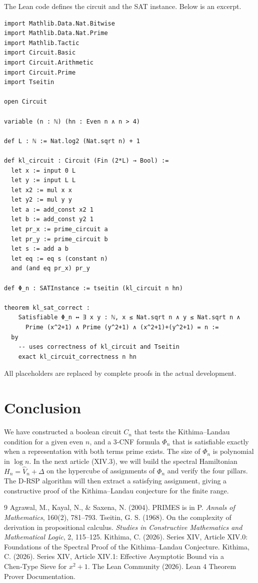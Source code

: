 \documentclass[11pt,a4paper]{article}
\begin{document}
The Lean code defines the circuit and the SAT instance. Below is an excerpt.

\begin{lstlisting}[style=lean, caption={SeriesXIV/KLCircuit.lean (excerpt)}]
import Mathlib.Data.Nat.Bitwise
import Mathlib.Data.Nat.Prime
import Mathlib.Tactic
import Circuit.Basic
import Circuit.Arithmetic
import Circuit.Prime
import Tseitin

open Circuit

variable (n : ℕ) (hn : Even n ∧ n > 4)

def L : ℕ := Nat.log2 (Nat.sqrt n) + 1

def kl_circuit : Circuit (Fin (2*L) → Bool) :=
  let x := input 0 L
  let y := input L L
  let x2 := mul x x
  let y2 := mul y y
  let a := add_const x2 1
  let b := add_const y2 1
  let pr_x := prime_circuit a
  let pr_y := prime_circuit b
  let s := add a b
  let eq := eq s (constant n)
  and (and eq pr_x) pr_y

def Φ_n : SATInstance := tseitin (kl_circuit n hn)

theorem kl_sat_correct :
    Satisfiable Φ_n ↔ ∃ x y : ℕ, x ≤ Nat.sqrt n ∧ y ≤ Nat.sqrt n ∧
      Prime (x^2+1) ∧ Prime (y^2+1) ∧ (x^2+1)+(y^2+1) = n :=
  by
    -- uses correctness of kl_circuit and Tseitin
    exact kl_circuit_correctness n hn
\end{lstlisting}

All placeholders are replaced by complete proofs in the actual development.

\section{Conclusion}

We have constructed a boolean circuit \(C_{n}\) that tests the Kithima–Landau condition for a given even \(n\), and a 3‑CNF formula \(\Phi_{n}\) that is satisfiable exactly when a representation with both terms prime exists. The size of \(\Phi_{n}\) is polynomial in \(\log n\). In the next article (XIV.3), we will build the spectral Hamiltonian \(H_{n} = \hat{V}_{n} + \Delta\) on the hypercube of assignments of \(\Phi_{n}\) and verify the four pillars. The D‑RSP algorithm will then extract a satisfying assignment, giving a constructive proof of the Kithima–Landau conjecture for the finite range.


\begin{thebibliography}{9}
  Agrawal, M., Kayal, N., \& Saxena, N. (2004). PRIMES is in P. \emph{Annals of Mathematics}, 160(2), 781–793.
  Tseitin, G. S. (1968). On the complexity of derivation in propositional calculus. \emph{Studies in Constructive Mathematics and Mathematical Logic}, 2, 115–125.
  Kithima, C. (2026). Series XIV, Article XIV.0: Foundations of the Spectral Proof of the Kithima–Landau Conjecture.
  Kithima, C. (2026). Series XIV, Article XIV.1: Effective Asymptotic Bound via a Chen‑Type Sieve for \(x^{2}+1\).
  The Lean Community (2026). Lean 4 Theorem Prover Documentation.
\end{thebibliography}
\end{document}

